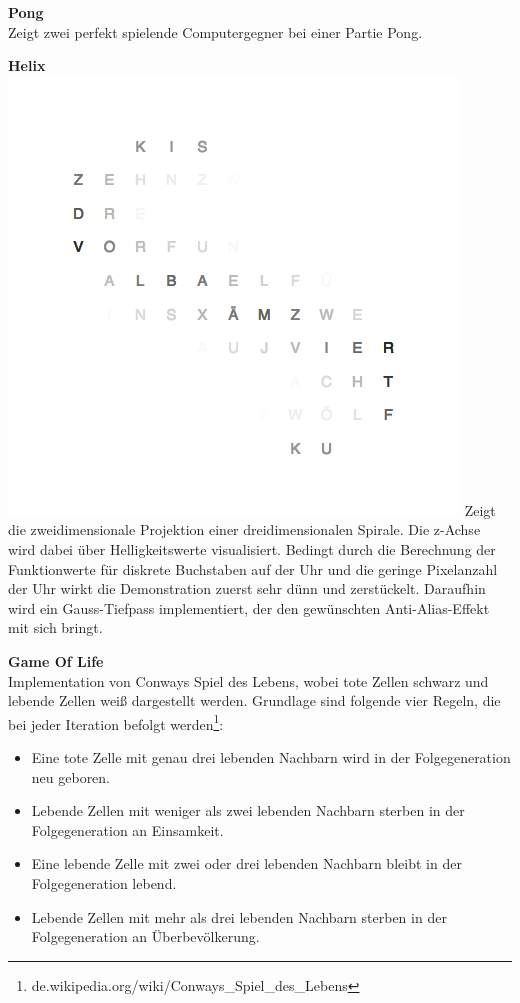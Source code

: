 \begin{multicols}{2}
\textbf{Pong} \\
Zeigt zwei perfekt spielende Computergegner bei einer Partie Pong.

\textbf{Helix} \\
\includegraphics[width=\columnwidth]{Abbildungen/Software/Demo/Helix}
Zeigt die zweidimensionale Projektion einer dreidimensionalen Spirale. Die z-Achse wird dabei über Helligkeitswerte visualisiert.
Bedingt durch die Berechnung der Funktionwerte für diskrete Buchstaben auf der Uhr und die geringe Pixelanzahl der Uhr wirkt die Demonstration zuerst sehr dünn und zerstückelt.
Daraufhin wird ein Gauss-Tiefpass implementiert, der den gewünschten Anti-Alias-Effekt mit sich bringt.

\textbf{Game Of Life} \\
Implementation von Conways Spiel des Lebens, wobei tote Zellen schwarz und lebende Zellen weiß dargestellt werden.
Grundlage sind folgende vier Regeln, die bei jeder Iteration befolgt werden\footnote{de.wikipedia.org/wiki/Conways\_Spiel\_des\_Lebens}:
\begin{itemize}
\item Eine tote Zelle mit genau drei lebenden Nachbarn wird in der Folgegeneration neu geboren.
\item Lebende Zellen mit weniger als zwei lebenden Nachbarn sterben in der Folgegeneration an Einsamkeit.
\item Eine lebende Zelle mit zwei oder drei lebenden Nachbarn bleibt in der Folgegeneration lebend.
\item Lebende Zellen mit mehr als drei lebenden Nachbarn sterben in der Folgegeneration an Überbevölkerung.
\end{itemize}


\end{multicols}
